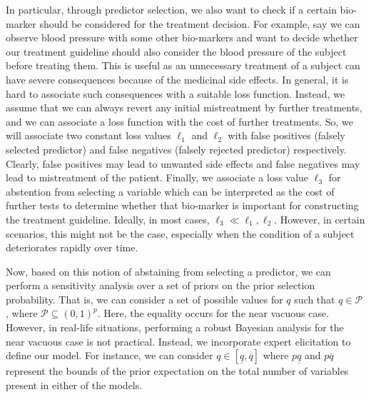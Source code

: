 \documentclass[preprint,12pt]{elsarticle}
\begin{document}
In particular, through predictor selection, we also want 
to check if a certain bio-marker should be considered
for the treatment decision. For example, say we can observe blood pressure with some
other bio-markers and want to decide whether our
treatment guideline should also consider the blood
pressure of the subject before treating them. This is
useful as an unnecessary treatment of a subject can have severe consequences because of the medicinal
side effects. In general, it is hard to associate such consequences 
with a suitable loss function. Instead, we
assume that we can always revert any initial mistreatment by further treatments, 
and we can associate a loss function with the cost of further treatments.
So, we will associate two constant loss values $\ell_1$ and $\ell_2$ 
with false positives (falsely selected predictor) and 
false negatives (falsely rejected predictor) respectively. 
Clearly, false positives may lead to unwanted side effects and
false negatives may lead to mistreatment of the patient. Finally, we associate
a loss value $\ell_3$ for abstention from selecting
a variable which can be interpreted as the cost of further tests to determine whether that bio-marker
is important for constructing the treatment guideline.
Ideally, in most cases, $\ell_3\ll \ell_1,\ell_2$. However, in certain scenarios,
this might not be the case, especially when the condition of a subject deteriorates rapidly
over time.

Now, based on this notion of abstaining from selecting a predictor, we can perform
a sensitivity analysis over a set of priors on the prior selection probability.
That is, we can consider a set of possible values for $q$ such that
$q\in\mathcal{P}$, where $\mathcal{P} \subseteq \left(0, 1\right)^{p}$.
Here, the equality occurs for the near vacuous case. However, in real-life
situations, performing a robust Bayesian analysis for the near vacuous case is 
not practical. Instead, we incorporate expert elicitation to define our model.
For instance, we can consider $q\in \left[\underline{q}, \overline{q}\right]$
where $p\underline{q}$ and $p\overline{q}$ represent the bounds of the prior expectation on the
total number of variables present in either of the models.
\end{document}
